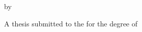   \makeatletter

\providecommand{\displaytitle}{\@title}
\begin{titlepage}
\begin{center}

  \large %

  {\Huge\textsc{\displaytitle}\par}


  by


  {\huge\textsc{\@author}}



    A thesis submitted to the \@institution{} for the degree of\\
  \textsc{\@degree}

  \vfill

  \flushright
    \@institution \\
    \@date

\end{center}
\end{titlepage}
  \makeatother
